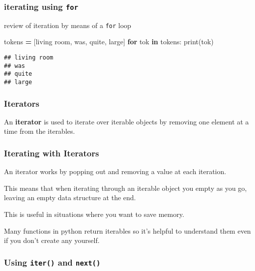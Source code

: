 \documentclass[
]{book}
\newenvironment{Shaded}{\begin{snugshade}}{\end{snugshade}}
\newcommand{\BuiltInTok}[1]{#1}
\newcommand{\ControlFlowTok}[1]{\textcolor[rgb]{0.13,0.29,0.53}{\textbf{#1}}}
\newcommand{\KeywordTok}[1]{\textcolor[rgb]{0.13,0.29,0.53}{\textbf{#1}}}
\newcommand{\NormalTok}[1]{#1}
\newcommand{\OperatorTok}[1]{\textcolor[rgb]{0.81,0.36,0.00}{\textbf{#1}}}
\newcommand{\StringTok}[1]{\textcolor[rgb]{0.31,0.60,0.02}{#1}}
\begin{document}
\subsubsection{\texorpdfstring{iterating using \texttt{for}}{iterating using for}}\label{iterating-using-for}

review of iteration by means of a \texttt{for} loop

\begin{Shaded}
\begin{Highlighting}[]
\NormalTok{tokens }\OperatorTok{=}\NormalTok{ [}\StringTok{\textquotesingle{}living room\textquotesingle{}}\NormalTok{, }\StringTok{\textquotesingle{}was\textquotesingle{}}\NormalTok{, }\StringTok{\textquotesingle{}quite\textquotesingle{}}\NormalTok{, }\StringTok{\textquotesingle{}large\textquotesingle{}}\NormalTok{]}
\ControlFlowTok{for}\NormalTok{ tok }\KeywordTok{in}\NormalTok{ tokens:}
    \BuiltInTok{print}\NormalTok{(tok)}
\end{Highlighting}
\end{Shaded}

\begin{verbatim}
## living room
## was
## quite
## large
\end{verbatim}

\subsubsection{Iterators}\label{iterators}

An \textbf{iterator} is used to iterate over iterable objects by removing one element at a time from the iterables.

\subsubsection{Iterating with Iterators}\label{iterating-with-iterators}

An iterator works by popping out and removing a value at each iteration.

This means that when iterating through an iterable object you empty as you go, leaving an empty data structure at the end.

This is useful in situations where you want to save memory.

Many functions in python return iterables so it's helpful to understand them even if you don't create any yourself.

\subsubsection{\texorpdfstring{Using \texttt{iter()} and \texttt{next()}}{Using iter() and next()}}\label{using-iter-and-next}
\end{document}
